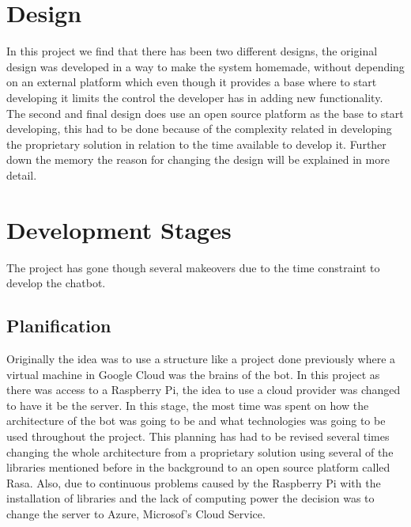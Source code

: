 \section{Design}\label{sec:chap4_design}

In this project we find that there has been two different designs, the original design was developed in a way to make the system homemade, without depending on an external platform which even though it provides a base where to start developing it limits the control the developer has in adding new functionality.\\

The second and final design does use an open source platform as the base to start developing, this had to be done because of the complexity related in developing the proprietary solution in relation to the time available to develop it. Further down the memory the reason for changing the design will be explained in more detail.

\section{Development Stages}\label{sec:chap1_dev-stag}
The project has gone though several makeovers due to the time constraint to develop the chatbot. 
\subsection{Planification}\label{sec:chap1_plan}
Originally the idea was to use a structure like a project done previously where a virtual machine in Google Cloud was the brains of the bot. In this project as there was access to a Raspberry Pi, the idea to use a cloud provider was changed to have it be the server. 
In this stage, the most time was spent on how the architecture of the bot was going to be and what technologies was going to be used throughout the project. This planning has had to be revised several times changing the whole architecture from a proprietary solution using several of the libraries mentioned before in the background to an open source platform called Rasa. Also, due to continuous problems caused by the Raspberry Pi with the installation of libraries and the lack of computing power the decision was to change the server to Azure, Microsof’s Cloud Service.
